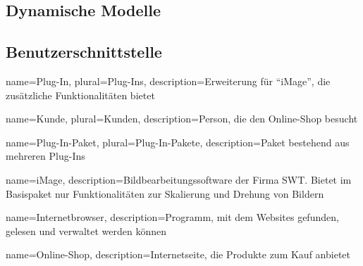 \documentclass[titlepage=true, parskip=full]{scrartcl}
\begin{document}
\subsection{Dynamische Modelle}

\subsection{Benutzerschnittstelle}




%
%
%
%
{
	name=Plug-In,
	plural=Plug-Ins,
	description={Erweiterung für \enquote{\gls{iMage}}, die zusätzliche Funktionalitäten bietet}
}

{
	name=Kunde,
	plural=Kunden,
	description={Person, die den \gls{Online-Shop} besucht}
}

{
	name=Plug-In-Paket,
	plural=Plug-In-Pakete,
	description={Paket bestehend aus mehreren \glspl{Plug-In}}
}

{
	name={iMage},
	description={Bildbearbeitungssoftware der Firma SWT. Bietet im Basispaket nur Funktionalitäten zur Skalierung und Drehung von Bildern}
}

{
	name={Internetbrowser},
	description={Programm, mit dem Websites gefunden, gelesen und verwaltet werden können}
}

{
	name={Online-Shop},
	description={Internetseite, die Produkte zum Kauf anbietet}
}
\end{document}
